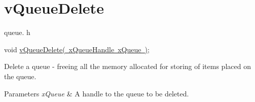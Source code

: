 \hypertarget{group__v_queue_delete}{}\section{v\+Queue\+Delete}
\label{group__v_queue_delete}
queue. h 
\begin{DoxyPre}void \mbox{\hyperlink{queue_8h_a9baffc75681546db871af6aecb346f41}{vQueueDelete( xQueueHandle xQueue )}};\end{DoxyPre}


Delete a queue -\/ freeing all the memory allocated for storing of items placed on the queue.


\begin{DoxyParams}{Parameters}
{\em x\+Queue} & A handle to the queue to be deleted. \\
\hline
\end{DoxyParams}
